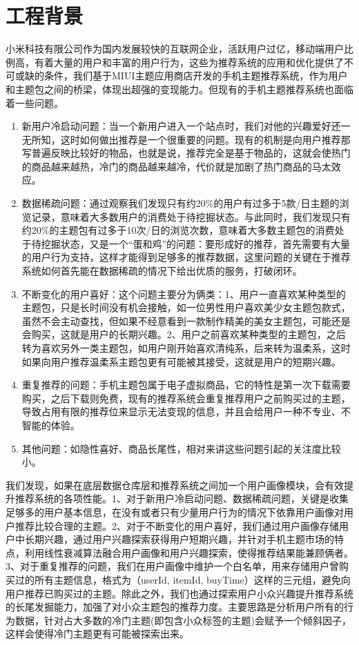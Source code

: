 \section{工程背景}
	小米科技有限公司作为国内发展较快的互联网企业，活跃用户过亿，移动端用户比例高，有着大量的用户和丰富的用户行为，这些为推荐系统的应用和优化提供了不可或缺的条件，我们基于MIUI主题应用商店开发的手机主题推荐系统，作为用户和主题包之间的桥梁，体现出超强的变现能力。但现有的手机主题推荐系统也面临着一些问题。
	\begin{enumerate}[(1)]
	\item 新用户冷启动问题：当一个新用户进入一个站点时，我们对他的兴趣爱好还一无所知，这时如何做出推荐是一个很重要的问题。现有的机制是向用户推荐那写普遍反映比较好的物品，也就是说，推荐完全是基于物品的，这就会使热门的商品越来越热，冷门的商品越来越冷，代价就是加剧了热门商品的马太效应。

	\item 数据稀疏问题：通过观察我们发现只有约20\%的用户有过多于5款/日主题的浏览记录，意味着大多数用户的消费处于待挖掘状态。与此同时，我们发现只有约20\%的主题包有过多于10次/日的浏览次数，意味着大多数主题包的消费处于待挖掘状态，又是一个“蛋和鸡”的问题：要形成好的推荐，首先需要有大量的用户行为支持，这样才能得到足够多的推荐数据，这里问题的关键在于推荐系统如何首先能在数据稀疏的情况下给出优质的服务，打破闭环。

	\item 不断变化的用户喜好：这个问题主要分为俩类：1、用户一直喜欢某种类型的主题包，只是长时间没有机会接触，如一位男性用户喜欢美少女主题包款式，虽然不会主动查找，但如果不经意看到一款制作精美的美女主题包，可能还是会购买，这就是用户的长期兴趣。2、用户之前喜欢某种类型的主题包，之后转为喜欢另外一类主题包，如用户刚开始喜欢清纯系，后来转为温柔系，这时如果向用户推荐温柔系主题包更有可能被其接受，这就是用户的短期兴趣。

	\item 重复推荐的问题：手机主题包属于电子虚拟商品，它的特性是第一次下载需要购买，之后下载则免费，现有的推荐系统会重复推荐用户之前购买过的主题，导致占用有限的推荐位来显示无法变现的信息，并且会给用户一种不专业、不智能的体验。

	\item 其他问题：如隐性喜好\citep{latent-cf}、商品长尾性\citep{long-tail}，相对来讲这些问题引起的关注度比较小。
	\end{enumerate}

	我们发现，如果在底层数据仓库层和推荐系统之间加一个用户画像模块，会有效提升推荐系统的各项性能。1、对于新用户冷启动问题、数据稀疏问题，关键是收集足够多的用户基本信息，在没有或者只有少量用户行为的情况下依靠用户画像对用户推荐比较合理的主题。2、对于不断变化的用户喜好，我们通过用户画像存储用户中长期兴趣，通过用户兴趣探索获得用户短期兴趣，并针对手机主题市场的特点，利用线性衰减算法融合用户画像和用户兴趣探索，使得推荐结果能兼顾俩者。3、对于重复推荐的问题，我们在用户画像中维护一个白名单，用来存储用户曾购买过的所有主题信息，格式为（userId, itemId, buyTime）这样的三元组，避免向用户推荐已购买过的主题。除此之外，我们也通过探索用户小众兴趣提升推荐系统的长尾发掘能力，加强了对小众主题包的推荐力度。主要思路是分析用户所有的行为数据，针对占大多数的冷门主题(即包含小众标签的主题)会赋予一个倾斜因子，这样会使得冷门主题更有可能被探索出来。

